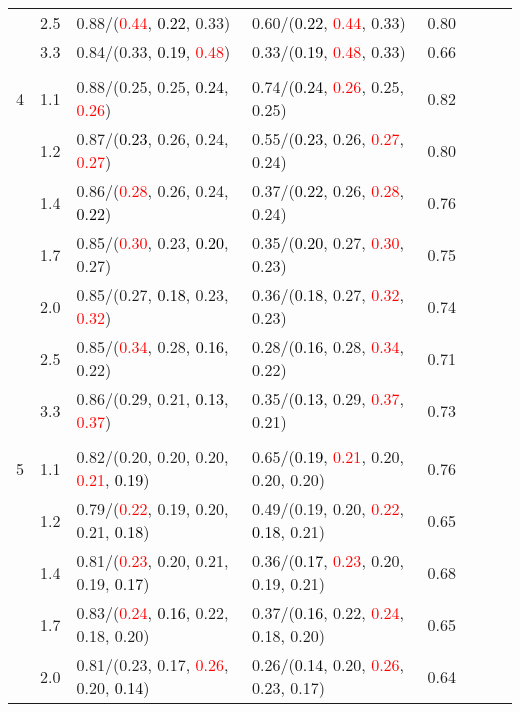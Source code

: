 \documentclass[10pt,a4paper]{report}
\begin{document}
\begin{table}[!htbp]
\begin{center}
{\begin{tabular}{ccllcccc}
			&2.5&0.88/(\textcolor{red}{0.44}, \textcolor{black}{0.22}, 0.33)&0.60/(\textcolor{black}{0.22}, \textcolor{red}{0.44}, 0.33)&0.80\\
			&3.3&0.84/(0.33, \textcolor{black}{0.19}, \textcolor{red}{0.48})&0.33/(\textcolor{black}{0.19}, \textcolor{red}{0.48}, 0.33)&0.66\\
			&&&&\\
			4			&1.1&0.88/(0.25, 0.25, \textcolor{black}{0.24}, \textcolor{red}{0.26})&0.74/(\textcolor{black}{0.24}, \textcolor{red}{0.26}, 0.25, 0.25)&0.82\\
			&1.2&0.87/(\textcolor{black}{0.23}, 0.26, 0.24, \textcolor{red}{0.27})&0.55/(\textcolor{black}{0.23}, 0.26, \textcolor{red}{0.27}, 0.24)&0.80\\
			&1.4&0.86/(\textcolor{red}{0.28}, 0.26, 0.24, \textcolor{black}{0.22})&0.37/(\textcolor{black}{0.22}, 0.26, \textcolor{red}{0.28}, 0.24)&0.76\\
			&1.7&0.85/(\textcolor{red}{0.30}, 0.23, \textcolor{black}{0.20}, 0.27)&0.35/(\textcolor{black}{0.20}, 0.27, \textcolor{red}{0.30}, 0.23)&0.75\\
			&2.0&0.85/(0.27, \textcolor{black}{0.18}, 0.23, \textcolor{red}{0.32})&0.36/(\textcolor{black}{0.18}, 0.27, \textcolor{red}{0.32}, 0.23)&0.74\\
			&2.5&0.85/(\textcolor{red}{0.34}, 0.28, \textcolor{black}{0.16}, 0.22)&0.28/(\textcolor{black}{0.16}, 0.28, \textcolor{red}{0.34}, 0.22)&0.71\\
			&3.3&0.86/(0.29, 0.21, \textcolor{black}{0.13}, \textcolor{red}{0.37})&0.35/(\textcolor{black}{0.13}, 0.29, \textcolor{red}{0.37}, 0.21)&0.73\\
			&&&&\\
			5			&1.1&0.82/(0.20, 0.20, 0.20, \textcolor{red}{0.21}, \textcolor{black}{0.19})&0.65/(\textcolor{black}{0.19}, \textcolor{red}{0.21}, 0.20, 0.20, 0.20)&0.76\\
			&1.2&0.79/(\textcolor{red}{0.22}, 0.19, 0.20, 0.21, \textcolor{black}{0.18})&0.49/(0.19, 0.20, \textcolor{red}{0.22}, \textcolor{black}{0.18}, 0.21)&0.65\\
			&1.4&0.81/(\textcolor{red}{0.23}, 0.20, 0.21, 0.19, \textcolor{black}{0.17})&0.36/(\textcolor{black}{0.17}, \textcolor{red}{0.23}, 0.20, 0.19, 0.21)&0.68\\
			&1.7&0.83/(\textcolor{red}{0.24}, \textcolor{black}{0.16}, 0.22, 0.18, 0.20)&0.37/(\textcolor{black}{0.16}, 0.22, \textcolor{red}{0.24}, 0.18, 0.20)&0.65\\
			&2.0&0.81/(0.23, 0.17, \textcolor{red}{0.26}, 0.20, \textcolor{black}{0.14})&0.26/(\textcolor{black}{0.14}, 0.20, \textcolor{red}{0.26}, 0.23, 0.17)&0.64\\

\end{tabular}}
\end{center}
\end{table}
\end{document}
